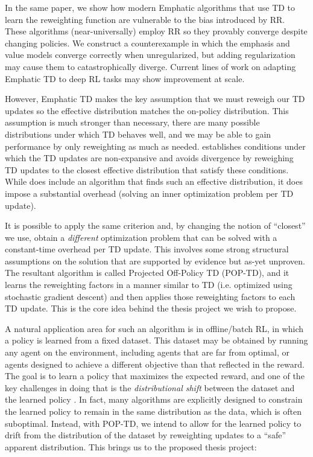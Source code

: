 \documentclass[11pt]{article}
\begin{document}
In the same paper, we show how modern Emphatic algorithms that use TD to learn the reweighting function are vulnerable to the bias introduced by RR. These algorithms (near-universally) employ RR so they provably converge despite changing policies. We construct a counterexample in which the emphasis and value models converge correctly when unregularized, but adding regularization may cause them to catastrophically diverge. Current lines of work on adapting Emphatic TD to deep RL tasks \cite{jiang2021emphatic,jiang2022learning} may show improvement at scale.

However, Emphatic TD makes the key assumption that we must reweigh our TD updates so the effective distribution matches the on-policy distribution. This assumption is much stronger than necessary, there are many possible distributions under which TD behaves well, and we may be able to gain performance by only reweighting as much as needed. \citet{kolter2011fixed} establishes  conditions under which the TD updates are non-expansive and avoids divergence by reweighing TD updates to the closest effective distribution that satisfy these conditions. While \cite{kolter2011fixed} does include an algorithm that finds such an effective distribution, it does impose a substantial overhead (solving an inner optimization problem per TD update).

It is possible to apply the same criterion and, by changing the notion of ``closest'' we use, obtain a \emph{different} optimization problem that can be solved with a constant-time overhead per TD update. This involves some strong structural assumptions on the solution that are supported by evidence but as-yet unproven. The resultant algorithm is called Projected Off-Policy TD (POP-TD), and it learns the reweighting factors in a manner similar to TD (i.e. optimized using stochastic gradient descent) and then applies those reweighting factors to each TD update. This is the core idea behind the thesis project we wish to propose.

A natural application area for such an algorithm is in offline/batch RL, in which a policy is learned from a fixed dataset. This dataset may be obtained by running any agent on the environment, including agents that are far from optimal, or agents designed to achieve a different objective than that reflected in the reward. The goal is to learn a policy that maximizes the expected reward, and one of the key challenges in doing that is the \emph{distributional shift} between the dataset and the learned policy \cite{levine2020survey}. In fact, many algorithms are explicitly designed to constrain the learned policy to remain in the same distribution as the data, which is often suboptimal. Instead, with POP-TD, we intend to allow for the learned policy to drift from the distribution of the dataset by reweighting updates to a ``safe'' apparent distribution. This brings us to the proposed thesis project:
\end{document}
